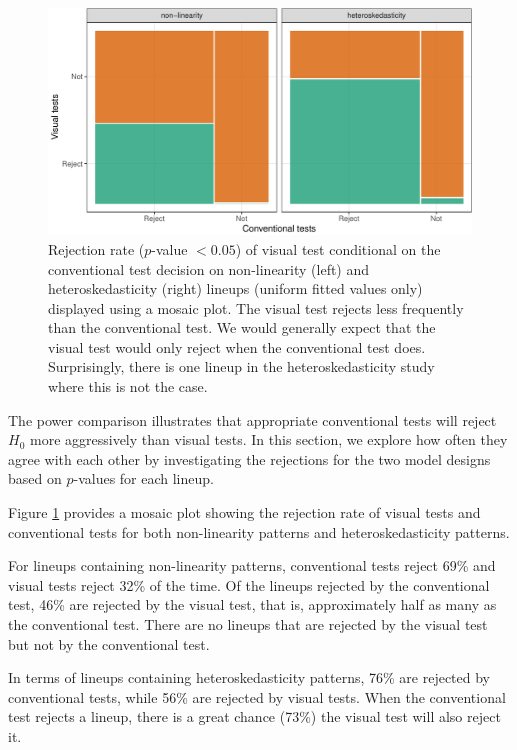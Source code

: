 \documentclass[]{interact}
\theoremstyle{plain}%
\theoremstyle{definition}
\theoremstyle{remark}
\begin{document}
\begin{figure}

{\centering \includegraphics[width=1\linewidth]{paper_comparison_files/figure-latex/p-value-comparison-1} 

}

\caption{Rejection rate ($p$-value $<0.05$) of visual test conditional on the conventional test decision on non-linearity (left) and heteroskedasticity (right) lineups (uniform fitted values only) displayed using a mosaic plot. The visual test rejects less frequently than the conventional test. We would generally expect that the visual test would only reject when the conventional test does. Surprisingly, there is one lineup in the heteroskedasticity study where this is not the case. }\label{fig:p-value-comparison}
\end{figure}

The power comparison illustrates that appropriate conventional tests
will reject \(H_0\) more aggressively than visual tests. In this
section, we explore how often they agree with each other by
investigating the rejections for the two model designs based on
\(p\)-values for each lineup.

Figure \ref{fig:p-value-comparison} provides a mosaic plot showing the
rejection rate of visual tests and conventional tests for both
non-linearity patterns and heteroskedasticity patterns.

For lineups containing non-linearity patterns, conventional tests reject
69\% and visual tests reject 32\% of the time. Of the lineups rejected
by the conventional test, 46\% are rejected by the visual test, that is,
approximately half as many as the conventional test. There are no
lineups that are rejected by the visual test but not by the conventional
test.

In terms of lineups containing heteroskedasticity patterns, 76\% are
rejected by conventional tests, while 56\% are rejected by visual tests.
When the conventional test rejects a lineup, there is a great chance
(73\%) the visual test will also reject it.
\end{document}
